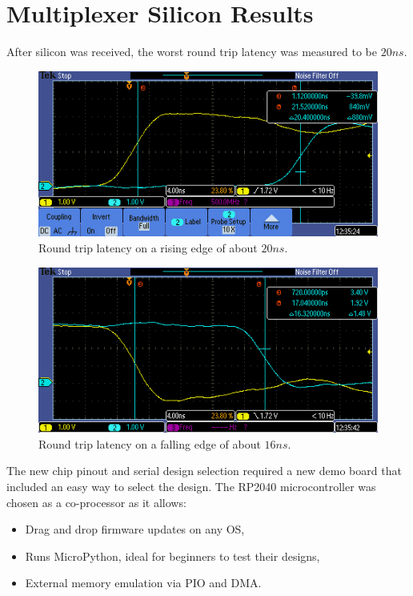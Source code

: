 \section{Multiplexer Silicon Results}
\label{sec:multiplexer_silicon_res}
After silicon was received, the worst round trip latency was measured to be \(20 ns\).

\begin{figure}[htp]
\centering
\includegraphics[width=\columnwidth]{./Figs/tt3p5 rising latency.PNG}
\caption{Round trip latency on a rising edge of about \(20 ns\).}
\label{fig:round_trip_latency_rising_edge}
\end{figure}

\begin{figure}[htp]
\centering
\includegraphics[width=\columnwidth]{./Figs/tt3p5 falling latency.PNG}
\caption{Round trip latency on a falling edge of about \(16 ns\).}
\label{fig:round_trip_latency_falling_edge}
\end{figure}

The new chip pinout and serial design selection required a new demo board that included an easy way to select the design.
The RP2040 microcontroller was chosen as a co-processor as it allows:
\begin{itemize}
\item Drag and drop firmware updates on any OS,
\item Runs MicroPython\cite{micropython}, ideal for beginners to test their designs,
\item External memory emulation via PIO and DMA.
\end{itemize}

